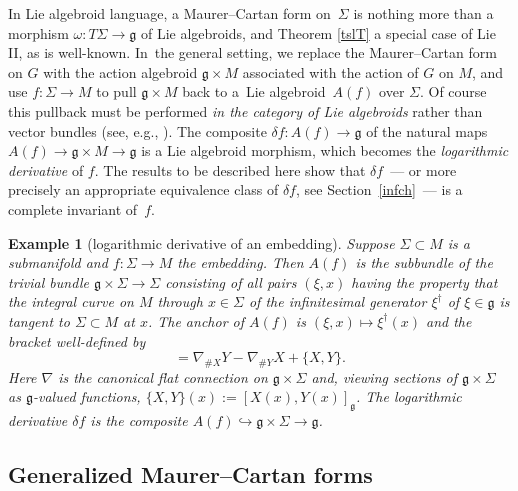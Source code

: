 \documentclass[11pt]{article}
\numberwithin{equation}{section}
\numberwithin{equation}{section}
\newtheorem{Example}[Theorem]{Example}
\begin{document}
In Lie algebroid language, a Maurer--Cartan form on~$\Sigma $ is
nothing more than a morphism
$\omega \colon {T \Sigma } \rightarrow {\mathfrak g}$ of Lie
algebroids, and Theorem \ref{tslT} a special case of Lie II, as is
well-known. In~the general setting, we replace the Maurer--Cartan form
on $G$ with the action algebroid ${\mathfrak g} \times M$ asso\-ci\-a\-ted
with the action of $G$ on $M$, and use $f \colon \Sigma \rightarrow M$
to pull ${\mathfrak g} \times M$ back to a~Lie algebroid~$A(f)$ over
$\Sigma $. Of course this pullback must be performed {\em in the
 category of Lie algebroids} rather than vector bundles (see, e.g.,
\cite[Section~4.2]{Mackenzie_05}). The composite
$ \delta f \colon A(f) \rightarrow {\mathfrak g}$ of the natural maps
$A(f) \rightarrow {\mathfrak g} \times M \rightarrow {\mathfrak g} $
is a Lie algebroid morphism, which becomes the {\it logarithmic
 derivative} of $f$. The results to be described here show that
$\delta f$~--- or more precisely an appropriate equivalence class of
$\delta f$, see Section~\ref{infch}~--- is a complete invariant of~$f$.

\begin{Example}[logarithmic derivative of an embedding] Suppose
$\Sigma \subset M$ is a submanifold and $f \colon \Sigma \rightarrow
M$ the embedding. Then $A(f)$ is the subbundle of the trivial bundle
${\mathfrak g} \times \Sigma \rightarrow \Sigma$ consisting of all
pairs $(\xi,x)$ having the property that the integral curve on $M$
through $x \in \Sigma $ of the infinitesimal generator $\xi^\dagger$
of $\xi \in {\mathfrak g} $ is tangent to $\Sigma \subset M$ at
$x$. The anchor of $A(f)$ is $(\xi,x) \mapsto \xi^\dagger(x)$ and the
bracket well-defined by
\begin{equation*} [X,Y]=\nabla_{\#X}Y-\nabla_{\#Y}X +\{X,Y\}.
\end{equation*} Here $\nabla $ is the canonical flat connection on
${\mathfrak g} \times \Sigma$ and, viewing sections of ${\mathfrak g}
\times \Sigma $ as ${\mathfrak g} $-valued functions,
$\{X,Y\}(x):=[X(x),Y(x)]_{\mathfrak g} $. The logarithmic derivative
$\delta f$ is the composite $A(f)\hookrightarrow {\mathfrak g} \times
\Sigma \rightarrow {\mathfrak g}$.
\end{Example}

\subsection*{Generalized Maurer--Cartan forms}%
\end{document}
